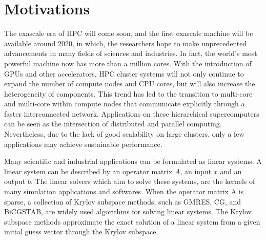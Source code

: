 \section{Motivations}

The exascale era of HPC will come soon, and the first exascale machine will be available around 2020, in which, the researchers hope to make unprecedented advancements in many fields of sciences and industries. In fact, the world's most powerful machine now has more than a million cores. With the introduction of GPUs and other accelerators, HPC cluster systems will not only continue to expand the number of compute nodes and CPU cores, but will also increase the heterogeneity of components. This trend has led to the transition to multi-core and multi-core within compute nodes that communicate explicitly through a faster interconnected network. Applications on these hierarchical supercomputers can be seen as the intersection of distributed and parallel computing. Nevertheless, due to the lack of good scalability on large clusters, only a few applications may achieve sustainable performance.

Many scientific and industrial applications can be formulated as linear systems. A linear system can be described by an operator matrix $A$, an input $x$ and an output $b$. The linear solvers which aim to solve these systems, are the kernels of many simulation applications and softwares. When the operator matrix A is sparse, a collection of Krylov subspace methods, such as GMRES, CG, and BiCGSTAB, are widely used algorithms for solving linear systems. The Krylov subspace methods approximate the exact solution of a linear system  from a given initial guess vector through the Krylov subspace.

